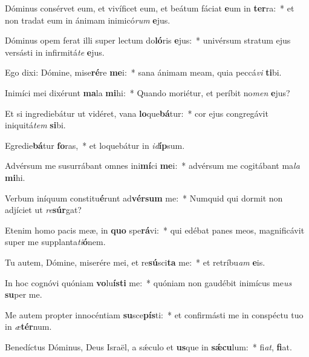 \item Dóminus consérvet eum, et vivíficet eum, et beátum fáciat \textbf{e}um in \textbf{ter}ra:~* et non tradat eum in ánimam inimicó\textit{rum} \textbf{e}jus.
\item Dóminus opem ferat illi super lectum do\textbf{ló}ris \textbf{e}jus:~* univérsum stratum ejus versásti in infirmitá\textit{te} \textbf{e}jus.
\item Ego dixi: Dómine, mise\textbf{ré}re \textbf{me}i:~* sana ánimam meam, quia peccá\textit{vi} \textbf{ti}bi.
\item Inimíci mei dixérunt \textbf{ma}la \textbf{mi}hi:~* Quando moriétur, et períbit no\textit{men} \textbf{e}jus?
\item Et si ingrediebátur ut vidéret, vana \textbf{lo}que\textbf{bá}tur:~* cor ejus congregávit iniquitá\textit{tem} \textbf{si}bi.
\item Egredie\textbf{bá}tur \textbf{fo}ras,~* et loquebátur in \textit{id}\textbf{íp}sum.
\item Advérsum me susurrábant omnes ini\textbf{mí}ci \textbf{me}i:~* advérsum me cogitábant ma\textit{la} \textbf{mi}hi.
\item Verbum iníquum constitu\textbf{é}runt ad\textbf{vér}\textbf{sum} me:~* Numquid qui dormit non adjíciet ut \textit{re}\textbf{súr}gat?
\item Etenim homo pacis meæ, in \textbf{quo} spe\textbf{rá}vi:~* qui edébat panes meos, magnificávit super me supplanta\textit{ti}\textbf{ó}nem.
\item Tu autem, Dómine, miserére mei, et re\textbf{sú}sci\textbf{ta} me:~* et retríbu\textit{am} \textbf{e}is.
\item In hoc cognóvi quóniam \textbf{vo}lu\textbf{ís}\textbf{ti} me:~* quóniam non gaudébit inimícus me\textit{us} \textbf{su}per me.
\item Me autem propter innocéntiam \textbf{su}sce\textbf{pís}ti:~* et confirmásti me in conspéctu tuo in \textit{æ}\textbf{tér}num.
\item Benedíctus Dóminus, Deus Israël, a sǽculo et \textbf{us}que in \textbf{sǽ}\textbf{cu}lum:~* fi\textit{at}, \textbf{fi}at.
